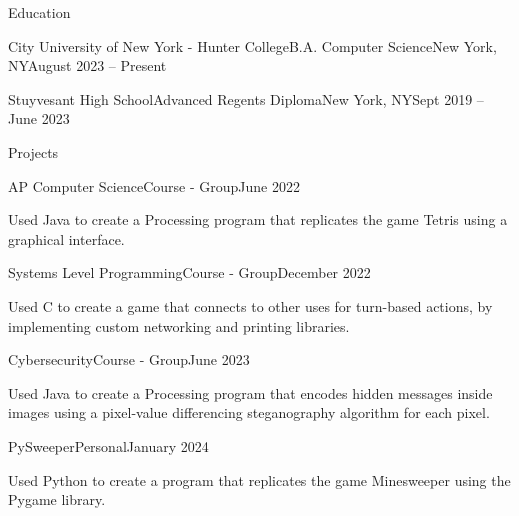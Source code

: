 \documentclass[]{kyvernitis-resume}
\begin{document}
\resumeheader
{}
{}
{}
{}
{}

\begin{section}{Education}
    \begin{subsectionnobullet}{City University of New York - Hunter College}{B.A. Computer Science}{New York, NY}{August 2023 -- Present}
    \end{subsectionnobullet}

    
    \begin{subsectionnobullet}{Stuyvesant High School}{Advanced Regents Diploma}{New York, NY}{Sept 2019 -- June 2023}
    \end{subsectionnobullet}
\end{section}



\begin{section}{Projects}
\begin{subsectionnobullet}{AP Computer Science}{Course - Group}{}{June 2022}
    \item{Used Java to create a Processing program that replicates the game Tetris using a graphical interface. }
\end{subsectionnobullet}
\begin{subsectionnobullet}{Systems Level Programming}{Course - Group}{}{December 2022}
    \item{Used C to create a game that connects to other uses for turn-based actions, by implementing custom networking and printing libraries. }
\end{subsectionnobullet}
\begin{subsectionnobullet}{Cybersecurity}{Course - Group}{}{June 2023}
    \item{Used Java to create a Processing program that encodes hidden messages inside images using a pixel-value differencing steganography algorithm for each pixel.}
\end{subsectionnobullet}

\begin{subsectionnobullet}{PySweeper}{Personal}{}{January 2024}
    \item{Used Python to create a program that replicates the game Minesweeper using the Pygame library.}
\end{subsectionnobullet}

\end{section}
\end{document}
